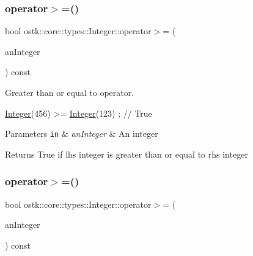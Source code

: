 \mbox{\label{classostk_1_1core_1_1types_1_1_integer_a86ebe2b3979f947ede75b516c60aff6c}} 
\subsubsection{\texorpdfstring{operator$>$=()}{operator>=()}\hspace{0.1cm}{\footnotesize\ttfamily [1/2]}}
{\footnotesize\ttfamily bool ostk\+::core\+::types\+::\+Integer\+::operator$>$= (\begin{DoxyParamCaption}\item[{const \hyperlink{classostk_1_1core_1_1types_1_1_integer}{Integer} \&}]{an\+Integer }\end{DoxyParamCaption}) const}



Greater than or equal to operator. 


\begin{DoxyCode}
\hyperlink{classostk_1_1core_1_1types_1_1_integer_a209b939281106d4b590ad98fae291af9}{Integer}(456) >= \hyperlink{classostk_1_1core_1_1types_1_1_integer_a209b939281106d4b590ad98fae291af9}{Integer}(123) ; \textcolor{comment}{// True}
\end{DoxyCode}



\begin{DoxyParams}[1]{Parameters}
\mbox{\tt in}  & {\em an\+Integer} & An integer \\
\hline
\end{DoxyParams}
\begin{DoxyReturn}{Returns}
True if lhs integer is greater than or equal to rhs integer 
\end{DoxyReturn}
\mbox{\label{classostk_1_1core_1_1types_1_1_integer_af09f62266905dd531a97356fd7f8305f}} 
\subsubsection{\texorpdfstring{operator$>$=()}{operator>=()}\hspace{0.1cm}{\footnotesize\ttfamily [2/2]}}
{\footnotesize\ttfamily bool ostk\+::core\+::types\+::\+Integer\+::operator$>$= (\begin{DoxyParamCaption}\item[{const \hyperlink{classostk_1_1core_1_1types_1_1_integer_a76a5f41f78659f116eafaf26cecc3244}{Integer\+::\+Value\+Type} \&}]{an\+Integer }\end{DoxyParamCaption}) const}

